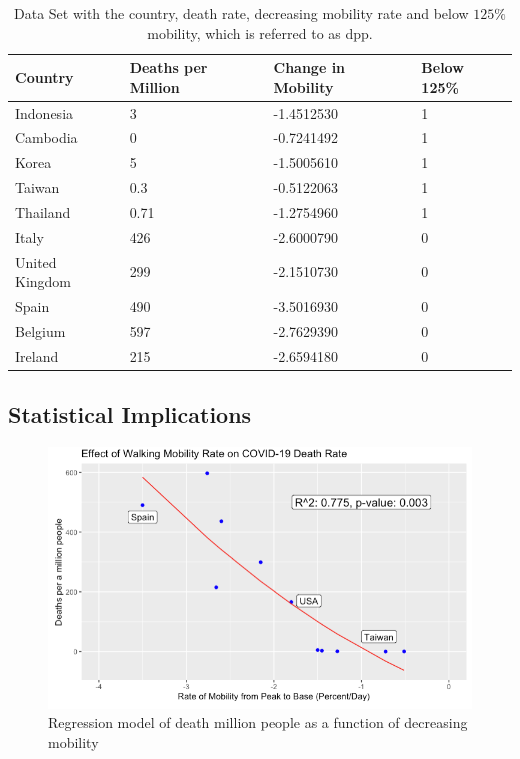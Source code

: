 \documentclass[11pt, english]{article}
\begin{document}
\begin{table}[h!]
\centering
\begin{tabular}{p{}p{}p{}p{}} \\ \toprule
\textbf{Country} & \textbf{Deaths per Million} & \textbf{Change in Mobility} & \textbf{Below 125\%} \\ \midrule
Indonesia & 3 & -1.4512530 & 1\\
Cambodia & 0 &-0.7241492 & 1 \\
Korea & 5 & -1.5005610 & 1 \\
Taiwan & 0.3 & -0.5122063 & 1 \\
Thailand & 0.71 & -1.2754960 & 1 \\
Italy & 426 & -2.6000790 & 0 \\
United Kingdom & 299 & -2.1510730 & 0 \\
Spain & 490 & -3.5016930 & 0 \\
Belgium & 597 & -2.7629390 & 0 \\
Ireland & 215 & -2.6594180 & 0 \\\bottomrule
\end{tabular}
\caption{Data Set with the country, death rate, decreasing mobility rate and below $125\%$ mobility, which is referred to as dpp.}
\end{table}
\clearpage
\subsection{Statistical Implications}
\begin{figure}[h!]
  \includegraphics[width=\linewidth]{image4.png}
  \caption{Regression model of death million people as a function of decreasing mobility}
  \label{fig:regression}
\end{figure}
\end{document}
